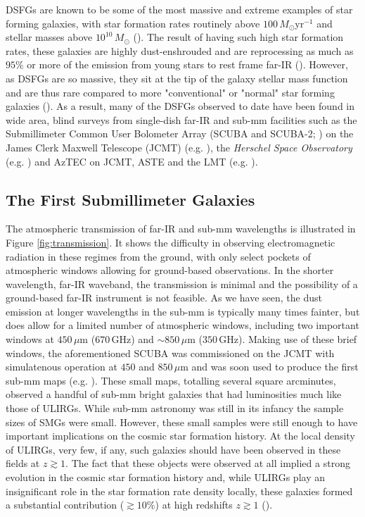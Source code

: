 DSFGs are known to be some of the most massive and extreme examples of star forming galaxies, with star formation rates routinely above $100\,M_\odot$yr$^{-1}$ and stellar masses above $10^{10}\,M_\odot$ (\citealt{Borys_2005, Michalowski_2010, Hainline_2011}). The result of having such high star formation rates, these galaxies are highly dust-enshrouded and are reprocessing as much as $95\%$ or more of the emission from young stars to rest frame far-IR (\citealt{Blain_2002, Casey_2014b}). However, as DSFGs are so massive, they sit at the tip of the galaxy stellar mass function and are thus rare compared to more "conventional" or "normal" star forming galaxies (\citealt{Chapman_2005}). As a result, many of the DSFGs observed to date have been found in wide area, blind surveys from single-dish far-IR and sub-mm facilities such as the Submillimeter Common User Bolometer Array (SCUBA and SCUBA-2; \citealt{Holland_1999, Holland_2013}) on the James Clerk Maxwell Telescope (JCMT) (e.g. \citealt{Smail_1997, Hughes_1998}), the \textit{Herschel Space Observatory} (e.g. \citealt{Eales_2010, Elbaz_2011, Oliver_2012}) and AzTEC on JCMT, ASTE and the LMT (e.g. \citealt{Scott_2008, Aretxaga_2011}).

\subsection{The First Submillimeter Galaxies}
\label{sec:first_submm_galaxies}

The atmospheric transmission of far-IR and sub-mm wavelengths is illustrated in Figure \ref{fig:transmission}. It shows the difficulty in observing electromagnetic radiation in these regimes from the ground, with only select pockets of atmospheric windows allowing for ground-based observations. In the shorter wavelength, far-IR waveband, the transmission is minimal and the possibility of a ground-based far-IR instrument is not feasible. As we have seen, the dust emission at longer wavelengths in the sub-mm is typically many times fainter, but does allow for a limited number of atmospheric windows, including two important windows at $450\,\mu$m ($670\,$GHz) and $\sim 850\,\mu$m ($350\,$GHz). Making use of these brief windows, the aforementioned SCUBA was commissioned on the JCMT with simulatenous operation at $450$ and $850\,\mu$m and was soon used to produce the first sub-mm maps (e.g. \citealt{Smail_1997, Barger_1998, Hughes_1998}). These small maps, totalling several square arcminutes, observed a handful of sub-mm bright galaxies that had luminosities much like those of ULIRGs. While sub-mm astronomy was still in its infancy the sample sizes of SMGs were small. However, these small samples were still enough to have important implications on the cosmic star formation history. At the local density of ULIRGs, very few, if any, such galaxies should have been observed in these fields at $z \gtrsim 1$. The fact that these objects were observed at all implied a strong evolution in the cosmic star formation history and, while ULIRGs play an insignificant role in the star formation rate density locally, these galaxies formed a substantial contribution ($\gtrsim 10\%$) at high redshifts $z \gtrsim 1$ (\citealt{Casey_2014b}). 

